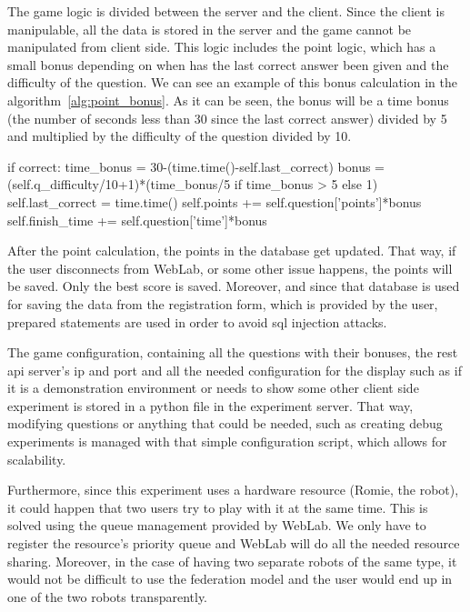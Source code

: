 The game logic is divided between the server and the client. Since the client is manipulable, all
the data is stored in the server and the game cannot be manipulated from client side. This logic
includes the point logic, which has a small bonus depending on when has the last correct answer been
given and the difficulty of the question. We can see an example of this bonus calculation in the
algorithm~\ref{alg:point_bonus}. As it can be seen, the bonus will be a time bonus (the number of
seconds less than 30 since the last correct answer) divided by 5 and multiplied by the difficulty of
the question divided by 10.

\begin{center}
\begin{minipage}{.9\textwidth}
\singlespace
{}
\begin{pyglist}[language=python, caption={Point bonus calculation.},
	label={alg:point_bonus}, listingname={Algorithm}, numbers=left]
if correct:
    time_bonus = 30-(time.time()-self.last_correct)
    bonus = (self.q_difficulty/10+1)*(time_bonus/5 if time_bonus > 5 else 1)
    self.last_correct = time.time()
    self.points += self.question['points']*bonus
    self.finish_time += self.question['time']*bonus
\end{pyglist}
\end{minipage}
\end{center}

After the point calculation, the points in the database get updated. That way, if the user
disconnects from WebLab, or some other issue happens, the points will be saved. Only the best
score is saved. Moreover, and since that database is used for saving the data from the registration
form, which is provided by the user, prepared statements are used in order to avoid \acrshort{sql}
injection attacks.

The game configuration, containing all the questions with their bonuses, the \acrshort{rest}
\acrshort{api} server's \acrshort{ip} and port and all the needed configuration for the display such
as if it is a demonstration environment or needs to show some other client side experiment is stored
in a python file in the experiment server. That way, modifying questions or anything that could be
needed, such as creating debug experiments is managed with that simple configuration script, which
allows for scalability.

Furthermore, since this experiment uses a hardware resource (Romie, the robot), it could happen that
two users try to play with it at the same time. This is solved using the queue management provided
by WebLab. We only have to register the resource's priority queue and WebLab will do all the needed
resource sharing. Moreover, in the case of having two separate robots of the same type, it would not
be difficult to use the federation model and the user would end up in one of the two robots
transparently.

